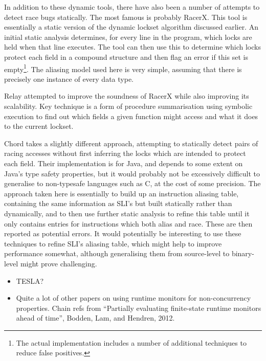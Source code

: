 In addition to these dynamic tools, there have also been a number of
attempts to detect race bugs statically.  The most famous is probably
RacerX\needCite{}.  This tool is essentially a static version of the
dynamic lockset algorithm discussed earlier.  An initial static
analysis determines, for every line in the program, which locks are
held when that line executes.  The tool can then use this to determine
which locks protect each field in a compound structure and then flag
an error if this set is empty\footnote{The actual implementation
  includes a number of additional techniques to reduce false
  positives.}.  The aliasing model used here is very simple, assuming
that there is precisely one instance of every data type.

Relay attempted to
improve the soundness of RacerX while also improving its scalability.
Key technique is a form of procedure summarisation using symbolic
execution to find out which fields a given function might access and
what it does to the current lockset.

Chord takes a slightly
different approach, attempting to statically detect pairs of racing
accesses without first inferring the locks which are intended to
protect each field.  Their implementation is for Java, and depends to
some extent on Java's type safety properties, but it would probably
not be excessively difficult to generalise to non-typesafe languages
such as C, at the cost of some precision.  The approach taken here is
essentially to build up an instruction aliasing table, containing the
same information as SLI's but built statically rather than
dynamically, and to then use further static analysis to refine this
table until it only contains entries for instructions which both alias
and race.  These are then reported as potential errors.  It would
potentially be interesting to use these techniques to refine SLI's
aliasing table, which might help to improve performance somewhat,
although generalising them from source-level to binary-level might
prove challenging.



\begin{itemize}
\item
  TESLA?
\item
  Quite a lot of other papers on using runtime monitors for non-concurrency properties.
  Chain refs from ``Partially evaluating finite-state runtime monitors ahead of time'', Bodden, Lam, and Hendren, 2012.
\end{itemize}

